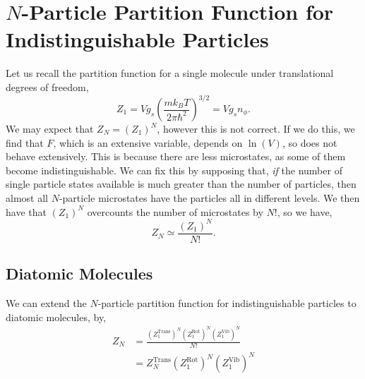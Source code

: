 \documentclass{book}
\begin{document}
\section{$N$-Particle Partition Function for Indistinguishable Particles}
Let us recall the partition function for a single molecule under translational degrees of freedom,
\begin{equation}
	Z_1 = Vg_s\left(\frac{mk_BT}{2\pi \hbar^2}\right)^{3/2} = Vg_sn_{\phi}.
\end{equation}
We may expect that $Z_N = (Z_1)^N$, however this is not correct. If we do this, we find that $F$, which is an extensive variable, depends on $\ln(V)$, so does not behave extensively. This is because there are less microstates, as some of them become indistinguishable. We can fix this by supposing that, \textit{if} the number of single particle states available is much greater than the number of particles, then almost all $N$-particle microstates have the particles all in different levels. We then have that $(Z_1)^N$ overcounts the number of microstates by $N!$, so we have,
\begin{equation}
	Z_N \simeq \frac{(Z_1)^N}{N!}. \label{eq:Z_N}
\end{equation}
\subsection{Diatomic Molecules}
We can extend the $N$-particle partition function for indistinguishable particles to diatomic molecules, by,
\begin{equation}
	\begin{split}
		Z_N & = \frac{\left(Z_1^{\text{Trans}}\right)^N\left(Z_1^{\text{Rot}}\right)^N\left(Z_1^{\text{Vib}}\right)^N}{N!} \\
		& = Z_N^{\text{Trans}}\left(Z_1^{\text{Rot}}\right)^N\left(Z_1^{\text{Vib}}\right)^N
	\end{split}
\end{equation}
\end{document}
